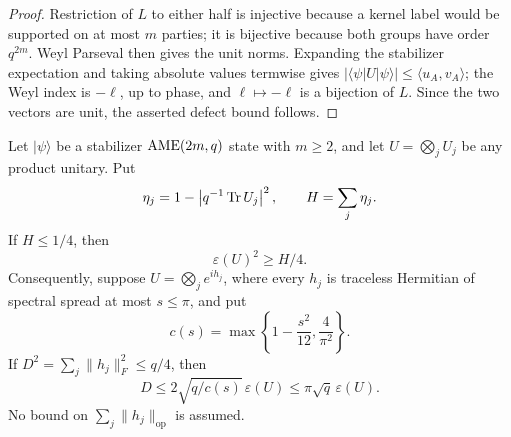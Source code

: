 \begin{proof}
Restriction of \(L\) to either half is injective because a kernel label
would be supported on at most \(m\) parties; it is bijective because both
groups have order \(q^{2m}\).  Weyl Parseval then gives the unit norms.
Expanding the stabilizer expectation and taking absolute values termwise
gives \(|\langle\psi|U|\psi\rangle|\leq\langle u_A,v_A\rangle\); the Weyl
index is \(-\ell\), up to phase, and \(\ell\mapsto-\ell\) is a bijection of
\(L\).  Since the two vectors are unit, the asserted defect bound follows.
\end{proof}

\begin{proposition}
\label{prop:main-residual-stability}
Let \(\lvert\psi\rangle\) be a stabilizer \(\mathrm{AME}(2m,q)\) state with
\(m\geq2\), and let \(U=\bigotimes_jU_j\) be any product unitary.  Put
\[
 \eta_j=1-\left|q^{-1}\operatorname{Tr} U_j\right|^2,
 \qquad H=\sum_j\eta_j.
\]
If \(H\leq1/4\), then
\[
 \varepsilon(U)^2\geq H/4.
\]
Consequently, suppose \(U=\bigotimes_je^{ih_j}\), where every \(h_j\) is
traceless Hermitian of spectral spread at most \(s\leq\pi\), and put
\[
 c(s)=\max\left\{1-\frac{s^2}{12},\frac4{\pi^2}\right\}.
\]
If \(D^2=\sum_j\lVert h_j\rVert_F^2\leq q/4\), then
\[
 D\leq2\sqrt{q/c(s)}\,\varepsilon(U)
 \leq\pi\sqrt q\,\varepsilon(U).
\]
No bound on \(\sum_j\lVert h_j\rVert_{\mathrm{op}}\) is assumed.
\end{proposition}

